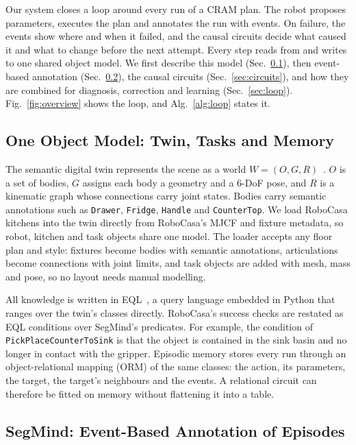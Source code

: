 \documentclass[letterpaper, 10 pt, conference]{ieeeconf}
\newcommand{\robocasa}{RoboCasa}
\newcommand{\segmind}{SegMind}
\newcommand{\eql}{EQL}
\begin{document}
Our system closes a loop around every run of a CRAM plan. The robot proposes
parameters, executes the plan and annotates the run with events. On failure,
the events show where and when it failed, and the causal circuits decide what
caused it and what to change before the next attempt. Every step reads from
and writes to one shared object model.
We first describe this model (Sec.~\ref{sec:sdt}), then event-based
annotation (Sec.~\ref{sec:segmind}), the causal circuits
(Sec.~\ref{sec:circuits}), and how they are combined for diagnosis, correction
and learning (Sec.~\ref{sec:loop}). Fig.~\ref{fig:overview} shows the loop, and
Alg.~\ref{alg:loop} states it.

\subsection{One Object Model: Twin, Tasks and Memory}
\label{sec:sdt}

The semantic digital twin represents the scene as a world
$W = (O, G, R)$~\cite{kuempel2021sdt}. $O$ is a set of bodies, $G$ assigns each
body a geometry and a 6-DoF pose, and $R$ is a kinematic graph whose
connections carry joint states. Bodies carry semantic annotations such as
\texttt{Drawer}, \texttt{Fridge}, \texttt{Handle} and \texttt{CounterTop}. We
load \robocasa{} kitchens into the twin directly from \robocasa{}'s MJCF and
fixture metadata, so robot, kitchen and task objects share one model. The
loader accepts any floor plan and style: fixtures become bodies with semantic
annotations, articulations become connections with joint limits, and task
objects are added with mesh, mass and pose, so no layout needs manual modelling.

All knowledge is written in \eql{}~\cite{bassiouny2026krrood}, a query language
embedded in Python that ranges over the twin's classes directly. \robocasa{}'s
success checks are restated as \eql{} conditions over \segmind{}'s predicates.
For example, the
condition of \texttt{PickPlaceCounterToSink} is that the object is contained in
the sink basin and no longer in contact with the gripper. Episodic memory stores
every run through an object-relational mapping (ORM) of the same classes: the action,
its parameters, the target, the target's neighbours and the events. A
relational circuit can therefore be fitted on memory without flattening it into
a table.

\subsection{\segmind{}: Event-Based Annotation of Episodes}
\label{sec:segmind}
\end{document}
